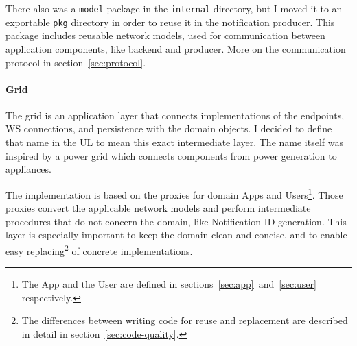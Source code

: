 There also was a \texttt{model} package
in the \texttt{internal} directory,
but I moved it to an exportable \texttt{pkg} directory
in order to reuse it in the notification producer.
This package includes reusable network models,
used for communication between application components,
like backend and producer.
More on the communication protocol in section~\ref{sec:protocol}.

\paragraph*{Grid}\label{sec:grid}

The grid is an application layer
that connects implementations of
the endpoints, \ac{WS} connections, and persistence
with the domain objects.
I decided to define that name in the \ac{UL}
to mean this exact intermediate layer.
The name itself was inspired by a power grid
which connects components
from power generation
to appliances.

The implementation is based on the proxies
for domain Apps and Users\footnote{
      The App and the User are defined in
      sections~\ref{sec:app}~and~\ref{sec:user}
      respectively.
}.
Those proxies convert the applicable network models
and perform intermediate procedures
that do not concern the domain,
like Notification \ac{ID} generation.
This layer is especially important
to keep the domain clean and concise,
and to enable easy replacing\footnote{
      The differences between writing code
      for reuse and replacement are described in detail
      in section~\ref{sec:code-quality}.
}
of concrete implementations.
